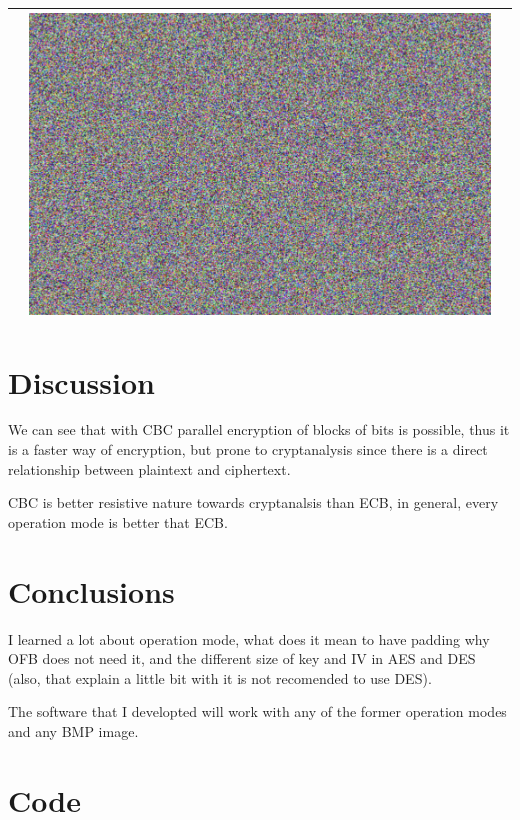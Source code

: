 \documentclass[fleqn, journal, onecolumn]{IEEEtran}             %
\theoremstyle{break}                                            %
\begin{document}
\begin{tabular}{|r || p{5cm} | p{5cm} | }
\begin{minipage}{.2\textwidth}
      \end{minipage}  & 
      \begin{minipage}{.2\textwidth}
        \includegraphics[width=\linewidth]{2DES4}
      \end{minipage}    
      \\\hline
 \end{tabular}


  \section{Discussion}

    We can see that with CBC parallel encryption of blocks of bits is possible, thus it is a faster way of encryption,
    but prone to cryptanalysis since there is a direct relationship between plaintext and ciphertext.

    CBC is better resistive nature towards cryptanalsis than ECB, in general, every operation mode is better that 
    ECB.

  \section{Conclusions}

    I learned a lot about operation mode, what does it mean to have padding why OFB does not need it, and the different size of
    key and IV in AES and DES (also, that explain a little bit with it is not recomended to use DES).

    The software that I developted will work with any of the former operation modes and any BMP image.

  \section{Code}
\end{document}
